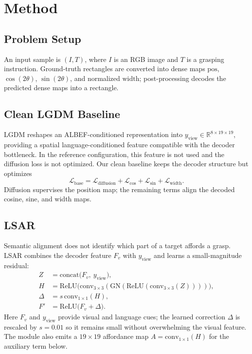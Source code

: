 \documentclass[10pt,twocolumn,letterpaper]{article}
\begin{document}
\section{Method}
\subsection{Problem Setup}
An input sample is $(I,T)$, where $I$ is an RGB image and $T$ is a grasping
instruction.  Ground-truth rectangles are converted into dense maps
$\mathrm{pos}$, $\cos(2\theta)$, $\sin(2\theta)$, and normalized
$\mathrm{width}$; post-processing decodes the predicted dense maps into a
rectangle.

\subsection{Clean LGDM Baseline}
LGDM reshapes an ALBEF-conditioned representation into
$y_{\mathrm{view}}\in\mathbb{R}^{8\times19\times19}$, providing a spatial
language-conditioned feature compatible with the decoder bottleneck.  In the
reference configuration, this feature is not used and the diffusion loss is
not optimized.  Our clean baseline keeps the decoder structure but optimizes
\begin{equation}
  \mathcal{L}_{\mathrm{base}} =
  \mathcal{L}_{\mathrm{diffusion}}
  + \mathcal{L}_{\cos}
  + \mathcal{L}_{\sin}
  + \mathcal{L}_{\mathrm{width}}.
\end{equation}
Diffusion supervises the position map; the remaining terms align the decoded
cosine, sine, and width maps.

\subsection{LSAR}
Semantic alignment does not identify which part of a target affords a grasp.
LSAR combines the decoder feature $F_v$ with $y_{\mathrm{view}}$ and learns a
small-magnitude residual:
\begin{align}
  Z &= \mathrm{concat}\bigl(F_v,\ y_{\mathrm{view}}\bigr), \\
  H &= \mathrm{ReLU}\bigl(\mathrm{conv}_{3\times3}(
        \mathrm{GN}(\mathrm{ReLU}(
          \mathrm{conv}_{3\times3}(Z))))\bigr), \\
  \Delta &= s\,\mathrm{conv}_{1\times1}(H), \\
  F' &= \mathrm{ReLU}\bigl(F_v+\Delta\bigr).
\end{align}
Here $F_v$ and $y_{\mathrm{view}}$ provide visual and language cues; the
learned correction $\Delta$ is rescaled by $s=0.01$ so it remains small
without overwhelming the visual feature.  The module also emits a $19\times19$
affordance map $A=\mathrm{conv}_{1\times1}(H)$ for the auxiliary term below.
\end{document}
